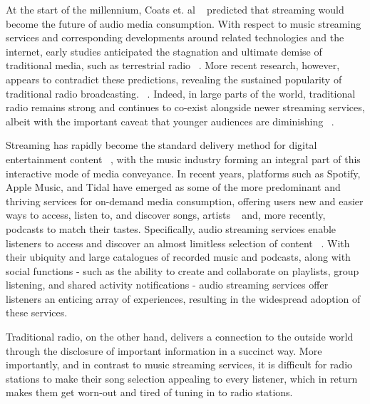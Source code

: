 \cleardoublepage
\label{chap:intro}
At the start of the millennium, Coats et. al ~\cite{Coats2000} predicted that streaming would become the future of audio media consumption. With respect to music streaming services and corresponding developments around related technologies and the internet, early studies anticipated the stagnation and ultimate demise of traditional media, such as terrestrial radio ~\cite{Ala-Fossi2008}. More recent research, however, appears to contradict these predictions, revealing the sustained popularity of traditional radio broadcasting. ~\cite{DangNguyen2012, Waits2007}. Indeed, in large parts of the world, traditional radio remains strong and continues to co-exist alongside newer streaming services, albeit with the important caveat that younger audiences are diminishing ~\cite{Albarran2007}. 

Streaming has rapidly become the standard delivery method for digital entertainment content ~\cite{Swaminathan2013}, with the music industry forming an integral part of this interactive mode of media conveyance. In recent years, platforms such as Spotify, Apple Music, and Tidal have emerged as  some of the more predominant and thriving services for on-demand media consumption, offering users new and easier ways to access, listen to, and discover songs, artists ~\cite{Weijters2014} and, more recently, podcasts to match their tastes. Specifically, audio streaming services enable listeners to access and discover an almost limitless selection of content ~\cite{Morris2015}. With their ubiquity and large catalogues of recorded music and podcasts, along with social functions - such as the ability to create and collaborate on playlists, group listening, and shared activity notifications - audio streaming services offer listeners an enticing array of experiences, resulting in the widespread adoption of these services. ~\cite{Mantymaki2015}

Traditional radio, on the other hand, delivers a connection to the outside world through the disclosure of important information in a succinct way. More importantly, and in contrast to music streaming services, it is difficult for radio stations to make their song selection appealing to every listener, which in return makes them get worn-out and tired of tuning in to radio stations. 

